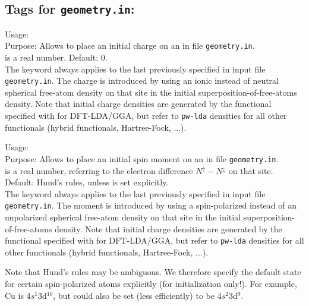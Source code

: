 \subsection*{Tags for \texttt{geometry.in}:}

{
  \noindent
  Usage:   \\[1.0ex]
  Purpose: Allows to place an initial charge on an  in
    file \texttt{geometry.in}. \\[1.0ex]
   is a real number. Default: 0. \\
}
The  keyword always applies to the last
 previously specified in input file
\texttt{geometry.in}. The charge is introduced by using an ionic
instead of neutral spherical free-atom density on that site in the
initial superposition-of-free-atoms density. Note that initial charge
densities are generated by the functional specified with 
for DFT-LDA/GGA, but refer to \texttt{pw-lda} densities for all other
functionals (hybrid functionals, Hartree-Fock, ...).

{
  \noindent
  Usage:   \\[1.0ex]
  Purpose: Allows to place an initial spin moment on an  in
    file \texttt{geometry.in}. \\[1.0ex]
   is a real number, referring to the electron
  difference $N^\uparrow - N^\downarrow$ on that site. Default: Hund's
  rules, unless  is set explicitly. \\
}
The  keyword always applies to the last
 previously specified in input file
\texttt{geometry.in}. The moment is introduced by using a
spin-polarized instead of an unpolarized spherical free-atom density
on that site in the initial superposition-of-free-atoms density. Note
that initial charge densities are generated by the functional
  specified with  
for DFT-LDA/GGA, but refer to \texttt{pw-lda} densities for all other
functionals (hybrid functionals, Hartree-Fock, ...).

Note that Hund's rules may be ambiguous. We therefore specify the default state for 
certain spin-polarized atoms explicitly (for initialization
only!). For example, Cu is 4$s^1$3d$^{10}$, but could also be set
(less efficiently) to be 4$s^2$3d$^{9}$.

